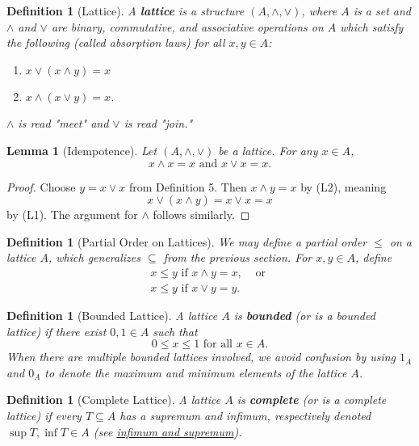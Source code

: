 \documentclass{article}
\newtheorem{lemma}[proposition]{Lemma}
\newtheorem{definition}[proposition]{Definition}
\newcommand{\meet}{\wedge}
\newcommand{\join}{\vee}
\begin{document}
\begin{definition}[Lattice]

A \textbf{lattice} is a structure $(A, \meet, \join)$, where $A$ is a set and $\meet$ and $\join$ are binary, commutative, and associative operations on $A$ which satisfy the following (called absorption laws) for all $x, y \in A$:

\begin{enumerate}
    \item[L1.]{$x \join (x \meet y) = x$}
    \item[L2.]{$x \meet (x \join y) = x$.}
\end{enumerate}

$\meet$ is read "meet" and $\join$ is read "join."

\end{definition}

\begin{lemma}[Idempotence]
Let $(A, \meet, \join)$ be a lattice. For any $x \in A$, $$x \meet x = x \text{ and } x \join x = x.$$
\end{lemma}

\begin{proof}
Choose $y = x \join x$ from Definition 5. Then $x \meet y = x$ by (L2), meaning $$x \join (x \meet y) = x \join x = x$$ by (L1). The argument for $\meet$ follows similarly.
\end{proof}

\begin{definition}[Partial Order on Lattices]
We may define a partial order $\leq$ on a lattice $A$, which generalizes $\subseteq$ from the previous section. For $x, y \in A$, define 
\begin{align*}
    x \leq y \text{ if } x \meet y = x, & \text{ or } \\
    x \leq y \text{ if } x \join y = y.
\end{align*}
\end{definition}

\begin{definition}[Bounded Lattice]
A lattice $A$ is \textbf{bounded} (or is a bounded lattice) if there exist $0, 1 \in A$ such that $$0 \leq x \leq 1 \text{ for all } x \in A.$$ When there are multiple bounded lattices involved, we avoid confusion by using $1_A$ and $0_A$ to denote the maximum and minimum elements of the lattice $A$.
\end{definition}

\begin{definition}[Complete Lattice]
A lattice $A$ is \textbf{complete} (or is a complete lattice) if every $T \subseteq A$ has a supremum and infimum, respectively denoted $\sup T, \inf T \in A$ (see \href{https://en.wikipedia.org/wiki/Infimum_and_supremum}{infimum and supremum}).
\end{definition}
\end{document}
